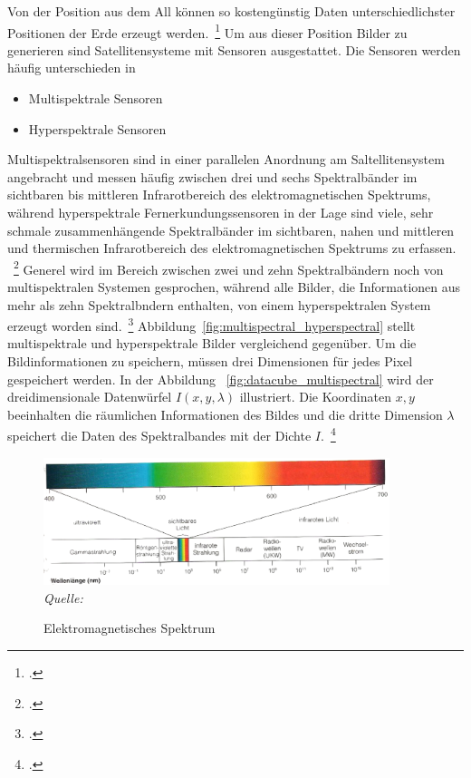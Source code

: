 Von der Position aus dem All können so kostengünstig Daten unterschiedlichster Positionen der Erde erzeugt
werden.~\footcite[\vglf][]{landgrebe.1997}
Um aus dieser Position Bilder zu generieren sind Satellitensysteme mit Sensoren ausgestattet.
Die Sensoren werden häufig unterschieden in
\begin {itemize}
    \item Multispektrale Sensoren
    \item Hyperspektrale Sensoren
\end {itemize}
Multispektralsensoren sind in einer parallelen Anordnung am Saltellitensystem angebracht und messen häufig zwischen drei
und sechs Spektralbänder im sichtbaren bis mittleren Infrarotbereich des elektromagnetischen Spektrums, während
hyperspektrale Fernerkundungssensoren in der Lage sind viele, sehr schmale zusammenhängende Spektralbänder im
sichtbaren, nahen und mittleren und thermischen Infrarotbereich des elektromagnetischen Spektrums zu erfassen.
~\footcite[\vglf][]{govender.2007}
Generel wird im Bereich zwischen zwei und zehn Spektralbändern noch von multispektralen Systemen gesprochen, während
alle Bilder, die Informationen aus mehr als zehn Spektralbndern enthalten, von einem hyperspektralen System erzeugt
worden sind.~\footcite[\vglf][]{ibraheem.2015}
Abbildung~\ref{fig:multispectral_hyperspectral} stellt multispektrale und hyperspektrale Bilder vergleichend gegenüber.
Um die Bildinformationen zu speichern, müssen drei Dimensionen für jedes Pixel gespeichert werden.
In der Abbildung ~\ref{fig:datacube_multispectral} wird der dreidimensionale Datenwürfel \(I(x,y,\lambda)\) illustriert.
Die Koordinaten \(x,y\) beeinhalten die räumlichen Informationen des Bildes und die dritte Dimension \(\lambda\)
speichert die Daten des Spektralbandes mit der Dichte \(I\).~\footcite[\vglf][]{ibraheem.2015}

\begin{figure}[H]
    \caption {Elektromagnetisches Spektrum}
    \label{fig:Spektrum}
    \includegraphics[width=0.9\textwidth]{abbildungen/spektralbaender.png}
    \\
    \textit{Quelle:~\cite[][]{ditzinger.2013}}
    \\
\end{figure}

